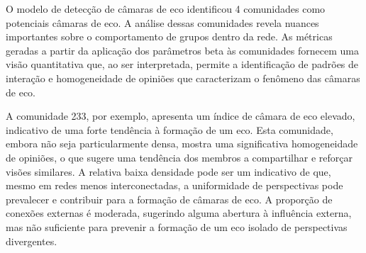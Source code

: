 \begin{table}[ht]
	\centering
	\caption{Resumo das Métricas de Câmaras de Eco das Comunidades em Santo André}
	\label{tab:community-metrics-santo-andre}
\end{table}

O modelo de detecção de câmaras de eco identificou 4 comunidades como potenciais câmaras de eco. A análise dessas comunidades revela nuances importantes sobre o comportamento de grupos dentro da rede. As métricas geradas a partir da aplicação dos parâmetros beta às comunidades fornecem uma visão quantitativa que, ao ser interpretada, permite a identificação de padrões de interação e homogeneidade de opiniões que caracterizam o fenômeno das câmaras de eco.

A comunidade 233, por exemplo, apresenta um índice de câmara de eco elevado, indicativo de uma forte tendência à formação de um eco. Esta comunidade, embora não seja particularmente densa, mostra uma significativa homogeneidade de opiniões, o que sugere uma tendência dos membros a compartilhar e reforçar visões similares. A relativa baixa densidade pode ser um indicativo de que, mesmo em redes menos interconectadas, a uniformidade de perspectivas pode prevalecer e contribuir para a formação de câmaras de eco. A proporção de conexões externas é moderada, sugerindo alguma abertura à influência externa, mas não suficiente para prevenir a formação de um eco isolado de perspectivas divergentes.


